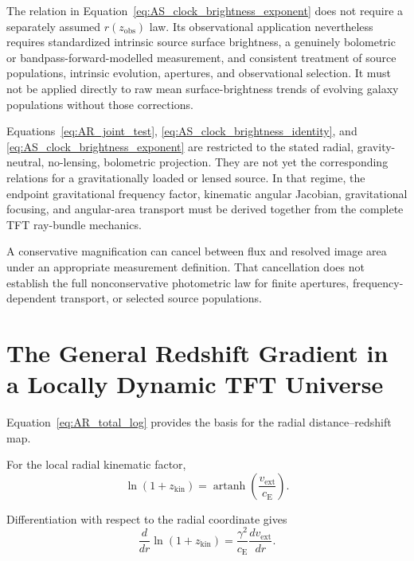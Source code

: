 The relation in
Equation~\eqref{eq:AS_clock_brightness_exponent}
does not require a separately assumed
\(r(z_{\mathrm{obs}})\)
law. Its observational application nevertheless requires standardized
intrinsic source surface brightness, a genuinely bolometric or
bandpass-forward-modelled measurement, and consistent treatment of source
populations, intrinsic evolution, apertures, and observational selection. It
must not be applied directly to raw mean surface-brightness trends of evolving
galaxy populations without those corrections.

Equations~\eqref{eq:AR_joint_test},
\eqref{eq:AS_clock_brightness_identity}, and
\eqref{eq:AS_clock_brightness_exponent}
are restricted to the stated radial, gravity-neutral, no-lensing, bolometric
projection. They are not yet the corresponding relations for a
gravitationally loaded or lensed source. In that regime, the endpoint
gravitational frequency factor, kinematic angular Jacobian, gravitational
focusing, and angular-area transport must be derived together from the
complete TFT ray-bundle mechanics.

A conservative magnification can cancel between flux and resolved image
area under an appropriate measurement definition. That cancellation does not
establish the full nonconservative photometric law for finite apertures,
frequency-dependent transport, or selected source populations.

\section{The General Redshift Gradient in a Locally Dynamic TFT Universe}

Equation~\eqref{eq:AR_total_log} provides the basis for the radial
distance--redshift map.

For the local radial kinematic factor,
\begin{equation}
    \ln(1+z_{\mathrm{kin}})
    =
    \operatorname{artanh}
    \left(
        \frac{
            v_{\mathrm{ext}}
        }{
            c_{\mathrm E}
        }
    \right).
    \label{eq:AR_atanh}
\end{equation}

Differentiation with respect to the radial coordinate gives
\begin{equation}
    \frac{
        d
    }{
        dr
    }
    \ln(1+z_{\mathrm{kin}})
    =
    \frac{
        \gamma^2
    }{
        c_{\mathrm E}
    }
    \frac{
        dv_{\mathrm{ext}}
    }{
        dr
    }.
    \label{eq:AR_zkin_gradient}
\end{equation}

